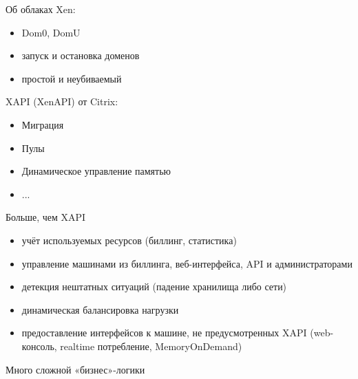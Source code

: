 \documentclass[10pt]{beamer}
\begin{document}
\begin{frame}[plain]
\end{frame}

\begin{frame}{Об облаках}
  Xen:
  \begin{itemize}
  \item Dom0, DomU
  \item запуск и остановка доменов
  \item простой и неубиваемый
  \end{itemize}
  XAPI (XenAPI) от Citrix:
  \begin{itemize}
  \item Миграция
  \item Пулы
  \item Динамическое управление памятью
  \item ...
  \end{itemize}
\end{frame}

\begin{frame}{Больше, чем XAPI}
  \begin{itemize}
  \item учёт используемых ресурсов (биллинг, статистика)
  \item управление машинами из биллинга, веб-интерфейса, API и администраторами
  \item детекция нештатных ситуаций (падение хранилища либо сети)
  \item динамическая балансировка нагрузки
  \item предоставление интерфейсов к машине, не предусмотренных XAPI
    (web-консоль, realtime потребление, MemoryOnDemand)
  \end{itemize}
  Много сложной «бизнес»-логики
\end{frame}
\end{document}
